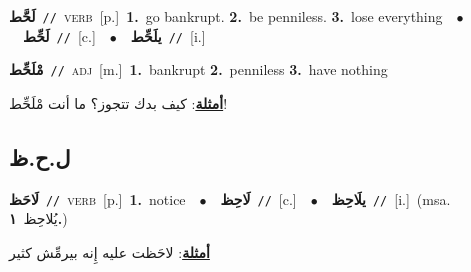 \documentclass[10pt,a4paper,twoside]{article} %
\begin{document}
\begin{multicols}{2}
{\setlength\topsep{0pt}\textbf{\foreignlanguage{arabic}{لَحَّط}}\ {\color{gray}\texttt{//}\color{black}}\ \textsc{verb}\ [p.]\ \textbf{1.}~go bankrupt.  \textbf{2.}~be penniless.  \textbf{3.}~lose everything\ \ $\bullet$\ \ \setlength\topsep{0pt}\textbf{\foreignlanguage{arabic}{لَحِّط}}\ {\color{gray}\texttt{//}\color{black}}\ [c.]\ \ $\bullet$\ \ \setlength\topsep{0pt}\textbf{\foreignlanguage{arabic}{يلَحِّط}}\ {\color{gray}\texttt{//}\color{black}}\ [i.]\ } \vspace{2mm}

{\setlength\topsep{0pt}\textbf{\foreignlanguage{arabic}{مْلَحِّط}}\ {\color{gray}\texttt{//}\color{black}}\ \textsc{adj}\ [m.]\ \textbf{1.}~bankrupt  \textbf{2.}~penniless  \textbf{3.}~have nothing\  \begin{flushright}\color{gray}\foreignlanguage{arabic}{\textbf{\underline{\foreignlanguage{arabic}{أمثلة}}}: كيف بدك تتجوز؟ ما أنت مْلَحِّط!}\end{flushright}\color{black}} \vspace{2mm}

\vspace{-3mm}
\subsection*{\color{blue}\foreignlanguage{arabic}{ل.ح.ظ}\color{blue}{}} 

{\setlength\topsep{0pt}\textbf{\foreignlanguage{arabic}{لَاحَظ}}\ {\color{gray}\texttt{//}\color{black}}\ \textsc{verb}\ [p.]\ \textbf{1.}~notice\ \ $\bullet$\ \ \setlength\topsep{0pt}\textbf{\foreignlanguage{arabic}{لَاحِظ}}\ {\color{gray}\texttt{//}\color{black}}\ [c.]\ \ $\bullet$\ \ \setlength\topsep{0pt}\textbf{\foreignlanguage{arabic}{يلَاحِظ}}\ {\color{gray}\texttt{//}\color{black}}\ [i.]\ \color{gray}(msa. \foreignlanguage{arabic}{يُلاحِظ}~\foreignlanguage{arabic}{\textbf{١.}})\color{black}\  \begin{flushright}\color{gray}\foreignlanguage{arabic}{\textbf{\underline{\foreignlanguage{arabic}{أمثلة}}}: لاحَظت عليه إِنه بيرمِّش كثير}\end{flushright}\color{black}} \vspace{2mm}


\end{multicols}
\end{document}
